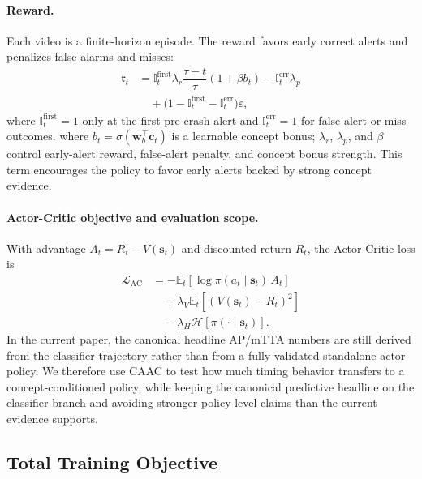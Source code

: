 \paragraph{Reward.}
Each video is a finite-horizon episode. The reward favors early correct alerts
and penalizes false alarms and misses:
\begin{equation}
  \begin{aligned}
    \mathfrak{r}_t
    &= \mathbb{I}^{\text{first}}_t \lambda_r \dfrac{\tau - t}{\tau}(1+\beta b_t)
    - \mathbb{I}^{\text{err}}_t \lambda_p \\
    &\quad + \bigl(1-\mathbb{I}^{\text{first}}_t-\mathbb{I}^{\text{err}}_t\bigr)\varepsilon,
  \end{aligned}
  \label{eq:reward}
\end{equation}
where $\mathbb{I}^{\text{first}}_t{=}1$ only at the first pre-crash alert and
$\mathbb{I}^{\text{err}}_t{=}1$ for false-alert or miss outcomes.
where $b_t = \sigma(\mathbf{w}_b^\top \mathbf{c}_t)$ is a learnable concept
bonus; $\lambda_r$, $\lambda_p$, and $\beta$ control early-alert reward,
false-alert penalty, and concept bonus strength. This term encourages the
policy to favor early alerts backed by strong concept evidence.

\paragraph{Actor-Critic objective and evaluation scope.}
With advantage $A_t = R_t - V(\mathbf{s}_t)$ and discounted return $R_t$, the
Actor-Critic loss is
\begin{align}
  \mathcal{L}_{\text{AC}}
  &= -\mathbb{E}_t[\log\pi(a_t\mid\mathbf{s}_t)\,A_t] \nonumber\\
  &\quad + \lambda_V \mathbb{E}_t[(V(\mathbf{s}_t)-R_t)^2] \nonumber\\
  &\quad - \lambda_H \mathcal{H}[\pi(\cdot\mid\mathbf{s}_t)].
  \label{eq:ac_loss}
\end{align}
In the current paper, the canonical headline AP/mTTA numbers are still derived
from the classifier trajectory rather than from a fully validated standalone
actor policy. We therefore use CAAC to test how much timing behavior transfers
to a concept-conditioned policy, while keeping the canonical predictive
headline on the classifier branch and avoiding stronger policy-level claims than
the current evidence supports.

\subsection{Total Training Objective}

